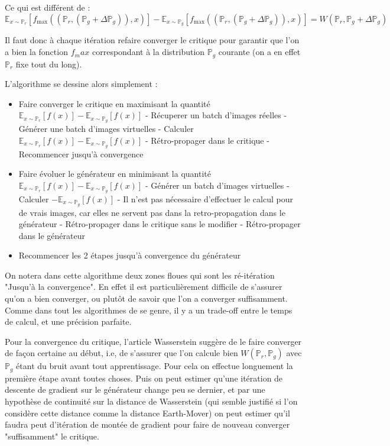 Ce qui est différent de :
 \[ \mathbb{E}_{x\sim\mathbb{P}_r}[f_\text{max}((\mathbb{P}_r, \left(\mathbb{P}_g+\Delta\mathbb{P}_g\right)), x)] - \mathbb{E}_{x\sim \mathbb{P}_g}[f_\text{max}((\mathbb{P}_r, \left(\mathbb{P}_g+\Delta\mathbb{P}_g\right)), x)] = W(\mathbb{P}_r, \mathbb{P}_g+\Delta\mathbb{P}_g)\]

 Il faut donc à chaque itération refaire converger le critique pour garantir que l'on a bien la fonction $f_max$ correspondant à la distribution $\mathbb{P}_g$ courante (on a en effet $\mathbb{P}_r$ fixe tout du long).

 L'algorithme se dessine alors simplement :
 \begin{itemize}
 \item Faire converger le critique en maximisant la quantité $\mathbb{E}_{x\sim\mathbb{P}_r}[f(x)] - \mathbb{E}_{x\sim\mathbb{P}_g}[f(x)] $
 \subitem - Récuperer un batch d'images réelles
 \subitem - Générer une batch d'images virtuelles
 \subitem - Calculer $\mathbb{E}_{x\sim\mathbb{P}_r}[f(x)] - \mathbb{E}_{x\sim\mathbb{P}_g}[f(x)] $
 \subitem - Rétro-propager dans le critique
 \subitem - Recommencer jusqu'à convergence
 \item Faire évoluer le générateur en minimisant la quantité $\mathbb{E}_{x\sim\mathbb{P}_r}[f(x)] - \mathbb{E}_{x\sim\mathbb{P}_g}[f(x)] $
 \subitem - Générer un batch d'images virtuelles
 \subitem - Calculer $- \mathbb{E}_{x\sim\mathbb{P}_g}[f(x)] $
 \subitem - Il n'est pas nécessaire d'effectuer le calcul pour de vrais images, car elles ne servent pas dans la retro-propagation dans le générateur
 \subitem - Rétro-propager dans le critique sans le modifier
 \subitem - Rétro-propager dans le générateur
 \item Recommencer les 2 étapes jusqu'à convergence du générateur
 \end{itemize}

 On notera dans cette algorithme deux zones floues qui sont les ré-itération "Jusqu'à la convergence". En effet il est particulièrement difficile de s'assurer qu'on a bien converger, ou plutôt de savoir que l'on a converger suffisamment. Comme dans tout les algorithmes de se genre, il y a un trade-off entre le temps de calcul, et une précision parfaite.

 Pour la convergence du critique, l'article Wasserstein \cite{arjovsky_wasserstein_2017} suggère de le faire converger de façon certaine au début, i.e, de s'assurer que l'on calcule bien $W ( \mathbb{P}_r, \mathbb{P}_g ) $ avec $\mathbb{P}_g$ étant du bruit avant tout apprentissage. Pour cela on effectue longuement la première étape avant toutes choses. Puis on peut estimer qu'une itération de descente de gradient sur le générateur change peu se dernier, et par une hypothèse de continuité sur la distance de Wasserstein (qui semble justifié si l'on considère cette distance comme la distance Earth-Mover) on peut estimer qu'il faudra peut d'itération de montée de gradient pour faire de nouveau converger "suffisamment" le critique.

